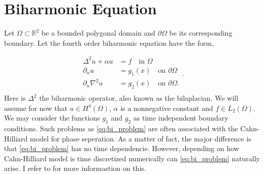 \newpage
\section{ Biharmonic Equation}
\label{sec:ch1}


Let $\Omega \subset   \mathbb{R} ^2$ be a bounded polygonal domain and $\partial \Omega $ be its corresponding boundary. Let the fourth order biharmonic equation have the form,

\begin{equation}
\label{eq:bi_problem}
\begin{split}
    \Delta^2  u  + \alpha  u  & = f \quad \text{in } \Omega   \\
    \partial _{n} u & = g_1\left( x \right)  \quad \text{on } \partial \Omega  \\
    \partial _{n} \nabla ^2 u & = g_{2}\left( x \right)  \quad \text{on } \partial \Omega .  \\
\end{split}
.\end{equation}
Here is $\Delta ^2$ the biharmonic operator, also known as the bilaplacian. We will assume for now that $u \in H^{4}\left( \Omega  \right) $, $\alpha $ is a nonnegative constant and $f \in L_{2}\left( \Omega  \right) $. We may consider the functions $g_{1}$ and $g_{2}$ as time independent boundary conditions. Such problems as \eqref{eq:bi_problem} are often associated with the Cahn-Hilliard model
\cite{cahnhilliard1957} for phase seperation. As a matter of fact, the major difference is that \eqref{eq:bi_problem}
has no time dependencie. However, depending on how Cahn-Hilliard model is time discretized numerically can
\eqref{eq:bi_problem} naturally arise. I refer to \cite{brenner2012quadratic} for more informastion on this.

